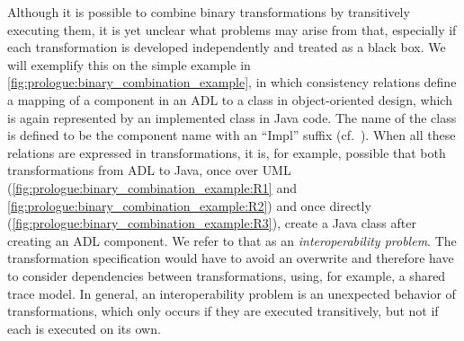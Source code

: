 Although it is possible to combine binary transformations by transitively executing them, it is yet unclear what problems may arise from that, especially if each transformation is developed independently and treated as a black box.
We will exemplify this on the simple example in \autoref{fig:prologue:binary_combination_example}, in which consistency relations define a mapping of a component in an \ac{ADL} to a class in object-oriented design, which is again represented by an implemented class in Java code. 
The name of the class is defined to be the component name with an \enquote{Impl} suffix (cf.~\cite{langhammer2017a}).
When all these relations are expressed in transformations, it is, for example, possible that both transformations from \ac{ADL} to Java, once over \ac{UML} (\ref{fig:prologue:binary_combination_example:R1} and \ref{fig:prologue:binary_combination_example:R2}) and once directly (\ref{fig:prologue:binary_combination_example:R3}), create a Java class after creating an \ac{ADL} component.
We refer to that as an \emph{interoperability problem}.
The transformation specification %
would have to avoid an overwrite and therefore have to consider dependencies between transformations, using, for example, a shared trace model.
In general, an interoperability problem is an unexpected behavior of transformations, which only occurs if they are executed transitively, but not if each is executed on its own. %

